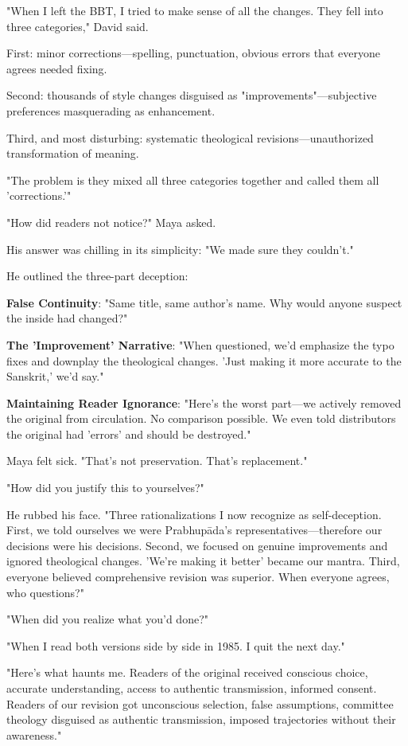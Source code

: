 \documentclass[12pt,twoside]{book}
\begin{document}
"When I left the BBT, I tried to make sense of all the changes. They fell into three categories," David said.

First: minor corrections—spelling, punctuation, obvious errors that everyone agrees needed fixing.

Second: thousands of style changes disguised as "improvements"—subjective preferences masquerading as enhancement.

Third, and most disturbing: systematic theological revisions—unauthorized transformation of meaning.

"The problem is they mixed all three categories together and called them all 'corrections.'"

"How did readers not notice?" Maya asked.

His answer was chilling in its simplicity: "We made sure they couldn't."

He outlined the three-part deception:

\textbf{\textbf{False Continuity}}: "Same title, same author's name. Why would anyone suspect the inside had changed?"

\textbf{\textbf{The 'Improvement' Narrative}}: "When questioned, we'd emphasize the typo fixes and downplay the theological changes. 'Just making it more accurate to the Sanskrit,' we'd say."

\textbf{\textbf{Maintaining Reader Ignorance}}: "Here's the worst part—we actively removed the original from circulation. No comparison possible. We even told distributors the original had 'errors' and should be destroyed."

Maya felt sick. "That's not preservation. That's replacement."

"How did you justify this to yourselves?"

He rubbed his face. "Three rationalizations I now recognize as self-deception. First, we told ourselves we were Prabhupāda's representatives—therefore our decisions were his decisions. Second, we focused on genuine improvements and ignored theological changes. 'We're making it better' became our mantra. Third, everyone believed comprehensive revision was superior. When everyone agrees, who questions?"

"When did you realize what you'd done?"

"When I read both versions side by side in 1985. I quit the next day."

"Here's what haunts me. Readers of the original received conscious choice, accurate understanding, access to authentic transmission, informed consent. Readers of our revision got unconscious selection, false assumptions, committee theology disguised as authentic transmission, imposed trajectories without their awareness."
\end{document}
